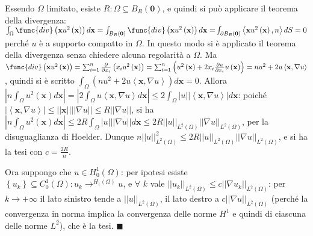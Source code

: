\documentclass{article}
\begin{document}
Essendo $\Omega $ limitato, esiste $R:\Omega \subseteq B_{R}\left( \mathbf{0}%
\right) $, e quindi si pu\`{o} applicare il teorema della divergenza: $%
\int_{\Omega }\func{div}\left( \mathbf{x}u^{2}\left( \mathbf{x}\right)
\right) d\mathbf{x}=\int_{B_{R}\left( \mathbf{0}\right) }\func{div}\left( 
\mathbf{x}u^{2}\left( \mathbf{x}\right) \right) d\mathbf{x=}\int_{\partial
B_{R}\left( \mathbf{0}\right) }\left\langle \mathbf{x}u^{2}\left( \mathbf{x}%
\right) ,n\right\rangle dS=0$ perch\'{e} $u$ \`{e} a supporto compatto in $%
\Omega $. In questo modo si \`{e} applicato il teorema della divergenza
senza chiedere alcuna regolarit\`{a} a $\Omega $. Ma $\func{div}\left( 
\mathbf{x}u^{2}\left( \mathbf{x}\right) \right) =\sum_{i=1}^{n}\frac{%
\partial }{\partial x_{i}}\left( x_{i}u^{2}\left( \mathbf{x}\right) \right)
=\sum_{i=1}^{n}\left( u^{2}\left( \mathbf{x}\right) +2x_{i}\frac{\partial u}{%
\partial x_{i}}u\left( \mathbf{x}\right) \right) =nu^{2}+2u\left\langle 
\mathbf{x},\nabla u\right\rangle $, quindi si \`{e} scritto $\int_{\Omega
}\left( nu^{2}+2u\left\langle \mathbf{x},\nabla u\right\rangle \right) d%
\mathbf{x}=0$. Allora $\left\vert n\int_{\Omega }u^{2}\left( \mathbf{x}%
\right) d\mathbf{x}\right\vert =\left\vert 2\int_{\Omega }u\left\langle 
\mathbf{x},\nabla u\right\rangle d\mathbf{x}\right\vert \leq 2\int_{\Omega
}\left\vert u\right\vert \left\vert \left\langle \mathbf{x},\nabla
u\right\rangle \right\vert d\mathbf{x}$: poich\'{e} $\left\vert \left\langle 
\mathbf{x},\nabla u\right\rangle \right\vert \leq \left\vert \left\vert 
\mathbf{x}\right\vert \right\vert \left\vert \left\vert \nabla u\right\vert
\right\vert \leq R\left\vert \left\vert \nabla u\right\vert \right\vert $,
si ha $\left\vert n\int_{\Omega }u^{2}\left( \mathbf{x}\right) d\mathbf{x}%
\right\vert \leq 2R\int_{\Omega }\left\vert u\right\vert \left\vert
\left\vert \nabla u\right\vert \right\vert d\mathbf{x}\leq 2R\left\vert
\left\vert u\right\vert \right\vert _{L^{2}\left( \Omega \right) }\left\vert
\left\vert \nabla u\right\vert \right\vert _{L^{2}\left( \Omega \right) }$,
per la disuguaglianza di Hoelder. Dunque $n\left\vert \left\vert
u\right\vert \right\vert _{L^{2}\left( \Omega \right) }^{2}\leq 2R\left\vert
\left\vert u\right\vert \right\vert _{L^{2}\left( \Omega \right) }\left\vert
\left\vert \nabla u\right\vert \right\vert _{L^{2}\left( \Omega \right) }$,
e si ha la tesi con $c=\frac{2R}{n}$.

Ora suppongo che $u\in H_{0}^{1}\left( \Omega \right) $: per ipotesi esiste $%
\left\{ u_{k}\right\} \subseteq C_{0}^{1}\left( \Omega \right)
:u_{k}\rightarrow ^{H_{1}\left( \Omega \right) }u$, e $\forall $ $k$ vale $%
\left\vert \left\vert u_{k}\right\vert \right\vert _{L^{2}\left( \Omega
\right) }\leq c\left\vert \left\vert \nabla u_{k}\right\vert \right\vert
_{L^{2}\left( \Omega \right) }$: per $k\rightarrow +\infty $ il lato
sinistro tende a $\left\vert \left\vert u\right\vert \right\vert
_{L^{2}\left( \Omega \right) }$, il lato destro a $c\left\vert \left\vert
\nabla u\right\vert \right\vert _{L^{2}\left( \Omega \right) }$ (perch\'{e}
la convergenza in norma implica la convergenza delle norme $H^{1}$ e quindi
di ciascuna delle norme $L^{2}$), che \`{e} la tesi. $\blacksquare $
\end{document}
